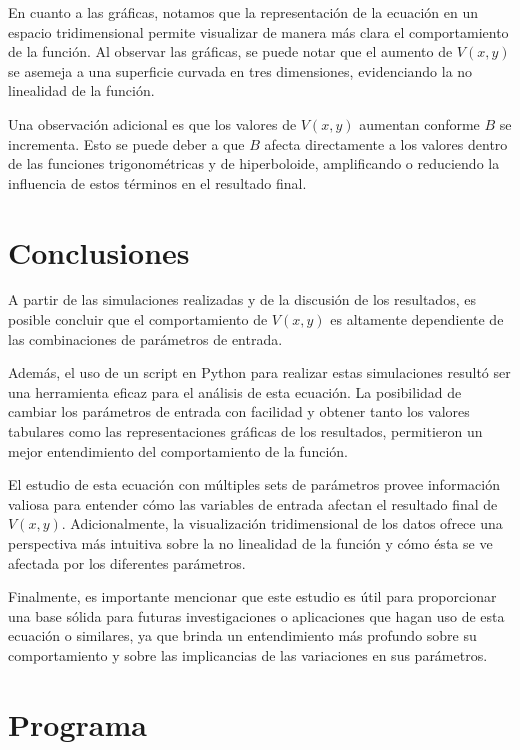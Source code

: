 En cuanto a las gráficas, notamos que la representación de la ecuación en un espacio tridimensional permite visualizar de manera más clara el comportamiento de la función. Al observar las gráficas, se puede notar que el aumento de $V(x, y)$ se asemeja a una superficie curvada en tres dimensiones, evidenciando la no linealidad de la función.\bigbreak

Una observación adicional es que los valores de $V(x, y)$ aumentan conforme $B$ se incrementa. Esto se puede deber a que $B$ afecta directamente a los valores dentro de las funciones trigonométricas y de hiperboloide, amplificando o reduciendo la influencia de estos términos en el resultado final.

\section{Conclusiones}

A partir de las simulaciones realizadas y de la discusión de los resultados, es posible concluir que el comportamiento de $V(x, y)$ es altamente dependiente de las combinaciones de parámetros de entrada.\bigbreak

Además, el uso de un script en Python para realizar estas simulaciones resultó ser una herramienta eficaz para el análisis de esta ecuación. La posibilidad de cambiar los parámetros de entrada con facilidad y obtener tanto los valores tabulares como las representaciones gráficas de los resultados, permitieron un mejor entendimiento del comportamiento de la función.\bigbreak

El estudio de esta ecuación con múltiples sets de parámetros provee información valiosa para entender cómo las variables de entrada afectan el resultado final de $V(x,y)$. Adicionalmente, la visualización tridimensional de los datos ofrece una perspectiva más intuitiva sobre la no linealidad de la función y cómo ésta se ve afectada por los diferentes parámetros.\bigbreak

Finalmente, es importante mencionar que este estudio es útil para proporcionar una base sólida para futuras investigaciones o aplicaciones que hagan uso de esta ecuación o similares, ya que brinda un entendimiento más profundo sobre su comportamiento y sobre las implicancias de las variaciones en sus parámetros.

\section{Programa}

